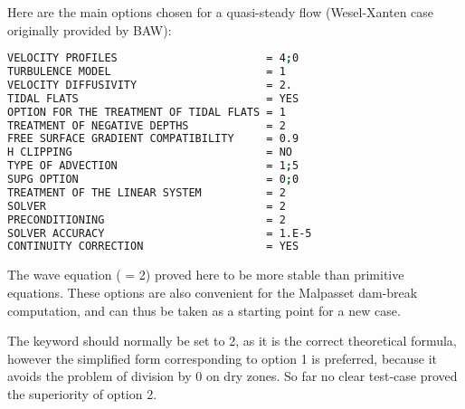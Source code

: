 Here are the main options chosen for a quasi-steady flow
(Wesel-Xanten case originally provided by BAW):
\begin{lstlisting}[language=bash]
VELOCITY PROFILES                       = 4;0
TURBULENCE MODEL                        = 1
VELOCITY DIFFUSIVITY                    = 2.
TIDAL FLATS                             = YES
OPTION FOR THE TREATMENT OF TIDAL FLATS = 1
TREATMENT OF NEGATIVE DEPTHS            = 2
FREE SURFACE GRADIENT COMPATIBILITY     = 0.9
H CLIPPING                              = NO
TYPE OF ADVECTION                       = 1;5
SUPG OPTION                             = 0;0
TREATMENT OF THE LINEAR SYSTEM          = 2
SOLVER                                  = 2
PRECONDITIONING                         = 2
SOLVER ACCURACY                         = 1.E-5
CONTINUITY CORRECTION                   = YES
\end{lstlisting}
The wave equation ( = 2) proved here
to be more stable than primitive equations.
These options are also convenient for the Malpasset dam-break computation,
and can thus be taken as a starting point for a new case.

The keyword  should normally be
set to 2, as it is the correct theoretical formula, however the simplified form
corresponding to option 1 is preferred, because it avoids the problem of
division by 0 on dry zones.
So far no clear test-case proved the superiority of option 2.
